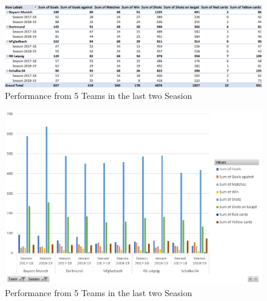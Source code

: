 \documentclass[11pt, journal]{IEEEtran}
\begin{document}
\begin{figure}[htb]
	\centering
		\includegraphics[width=1.0\columnwidth]{images/Pivot_Performance_Top5-LastSeason_In_Seasons201819-201718}
	\caption{Performance from 5 Teams in the last two Seasion }
	\label{tab:probov}
\end{figure}
\begin{figure}[htb]
	\centering
		\includegraphics[width=1.0\columnwidth]{images/BarGraph_Performance_Top5-LastSeason_In_Seasons201819-201718}
	\caption{Performance from 5 Teams in the last two Seasion }
	\label{fig:probov}
\end{figure}
\end{document}
